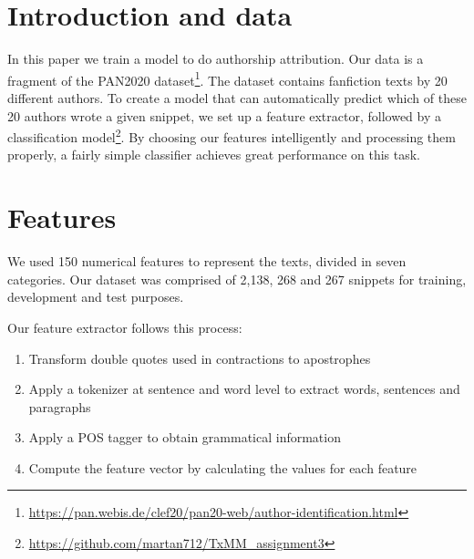 \documentclass[11pt,twocolumn]{article}
\begin{document}

\section{Introduction and data}
In this paper we train a model to do authorship attribution. Our data is a fragment of the PAN2020 dataset\footnote{\href{https://pan.webis.de/clef20/pan20-web/author-identification.html}{https://pan.webis.de/clef20/pan20-web/author-identification.html}}. The dataset contains fanfiction texts by 20 different authors. To create a model that can automatically predict which of these 20 authors wrote a given snippet, we set up a feature extractor, followed by a classification model\footnote{\url{https://github.com/martan712/TxMM_assignment3}}. By choosing our features intelligently and processing them properly, a fairly simple classifier achieves great performance on this task.

\section{Features}

We used 150 numerical features to represent the texts, divided in seven categories. Our dataset was comprised of 2,138, 268 and 267 snippets for training, development and test purposes.

Our feature extractor follows this process:
\begin{enumerate}
    \item Transform double quotes used in contractions to apostrophes
    \item Apply a tokenizer at sentence and word level to extract words, sentences and paragraphs
    \item Apply a POS tagger to obtain grammatical information
    \item Compute the feature vector by calculating the values for each feature
\end{enumerate}
\end{document}
